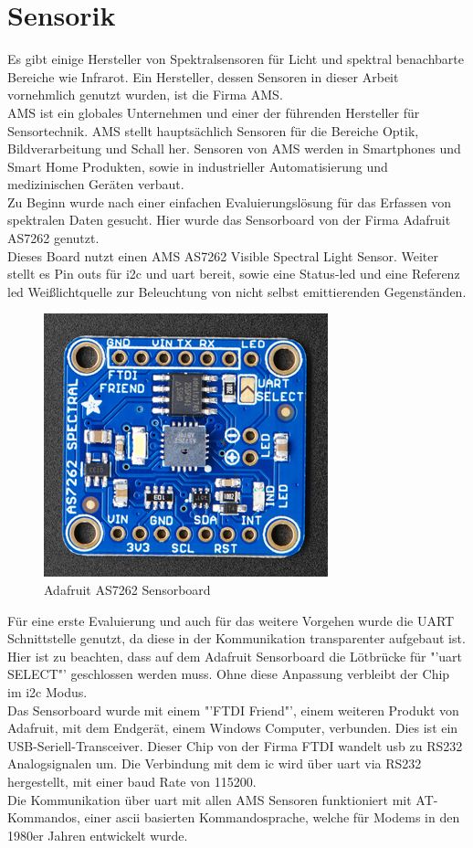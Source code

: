 \documentclass[11pt]{scrartcl}
\begin{document}
\section{Sensorik}
Es gibt einige Hersteller von Spektralsensoren für Licht und spektral benachbarte Bereiche wie Infrarot.
Ein Hersteller, dessen Sensoren in dieser Arbeit vornehmlich genutzt wurden, ist die Firma AMS.\\
AMS ist ein globales Unternehmen und einer der führenden Hersteller für Sensortechnik. AMS stellt hauptsächlich Sensoren für die Bereiche
Optik, Bildverarbeitung und Schall her. Sensoren von AMS werden in Smartphones und Smart Home Produkten, sowie in industrieller
Automatisierung und medizinischen Geräten verbaut. \cite{ams}\\
Zu Beginn wurde nach einer einfachen Evaluierungslösung für das Erfassen von spektralen Daten gesucht. Hier wurde das
Sensorboard von der Firma Adafruit AS7262 genutzt. \cite{adafruit}\\
Dieses Board nutzt einen AMS AS7262 Visible Spectral Light Sensor. Weiter stellt es Pin outs für \ac{i2c} und \ac{uart} bereit,
sowie eine Status-\ac{led} und eine Referenz \ac{led} Weißlichtquelle zur Beleuchtung von nicht selbst emittierenden Gegenständen.
\begin{figure}[H]
    \begin{center}
        \includegraphics[width=.48\textwidth]{images/AS7262_front.png}
    \end{center}
    \caption[Adafruit AS7262 Sensorboard]{Adafruit AS7262 Sensorboard \cite{adafruit}}
\end{figure}
\noindent
Für eine erste Evaluierung und auch für das weitere Vorgehen wurde die UART Schnittstelle genutzt, da diese in der Kommunikation
transparenter aufgebaut ist.\\
Hier ist zu beachten, dass auf dem Adafruit Sensorboard die Lötbrücke für "'\ac{uart} SELECT"' geschlossen werden muss. Ohne diese
Anpassung verbleibt der Chip im \ac{i2c} Modus.\\
Das Sensorboard wurde mit einem "'FTDI Friend"', einem weiteren Produkt von Adafruit, mit dem Endgerät, einem Windows Computer, verbunden.
Dies ist ein USB-Seriell-Transceiver. Dieser Chip von der Firma FTDI wandelt \ac{usb} zu RS232 Analogsignalen um. Die Verbindung mit dem
\ac{ic} wird über \ac{uart} via RS232 hergestellt, mit einer \ac{baud} Rate von 115200.\\
Die Kommunikation über \ac{uart} mit allen AMS Sensoren funktioniert mit AT-Kommandos, einer \ac{ascii} basierten Kommandosprache,
welche für Modems in den 1980er Jahren entwickelt wurde.
\end{document}
